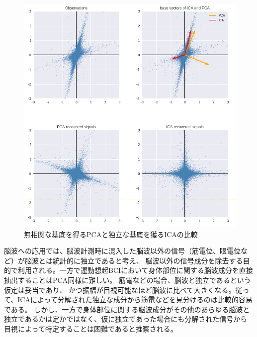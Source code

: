 \begin{figure}
    \centering
    \includegraphics[width=15cm]{images/ica_pca.png}
    \caption{無相関な基底を得るPCAと独立な基底を獲るICAの比較}
    \label{fig:ica_pca}
\end{figure}


脳波への応用では、脳波計測時に混入した脳波以外の信号（筋電位、眼電位など）が脳波とは統計的に独立であると考え、
脳波以外の信号成分を除去する目的で利用される。一方で運動想起BCIにおいて身体部位に関する脳波成分を直接抽出することはPCA同様に難しい。
筋電などの場合、脳波と独立であるという仮定は妥当であり、
かつ振幅が目視可能なほど脳波に比べて大きくなる。従って、ICAによって分解された独立な成分から筋電などを見分けるのは比較的容易である。
しかし、一方で身体部位に関する脳波成分がその他のあらゆる脳波と独立であるかは定かではなく、仮に独立であった場合にも分解された信号から
目視によって特定することは困難であると推察される。

